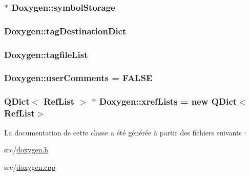 \subsubsection[{symbol\+Storage}]{ $\ast$ Doxygen\+::symbol\+Storage\hspace{0.3cm}{\ttfamily [static]}}\label{class_doxygen_ad63a00fa6d4a5378ab8cd988e0b6df16}
\hypertarget{class_doxygen_a88e47b2392d8845dfb569e4eb56672d4}{}
\subsubsection[{tag\+Destination\+Dict}]{ Doxygen\+::tag\+Destination\+Dict\hspace{0.3cm}{\ttfamily [static]}}\label{class_doxygen_a88e47b2392d8845dfb569e4eb56672d4}
\hypertarget{class_doxygen_ac397d1829788d1ed990f7a240fe28a7c}{}
\subsubsection[{tagfile\+List}]{ Doxygen\+::tagfile\+List\hspace{0.3cm}{\ttfamily [static]}}\label{class_doxygen_ac397d1829788d1ed990f7a240fe28a7c}
\hypertarget{class_doxygen_aa3fdcd31e3aed249e9f27d76dd11d12e}{}
\subsubsection[{user\+Comments}]{ Doxygen\+::user\+Comments = {\bf F\+A\+L\+S\+E}\hspace{0.3cm}{\ttfamily [static]}}\label{class_doxygen_aa3fdcd31e3aed249e9f27d76dd11d12e}
\hypertarget{class_doxygen_a645b82fe7debf260fbedd01c59e3bb87}{}
\subsubsection[{xref\+Lists}]{\setlength{\rightskip}{0pt plus 5cm}Q\+Dict$<$ {\bf Ref\+List} $>$ $\ast$ Doxygen\+::xref\+Lists = new Q\+Dict$<${\bf Ref\+List}$>$\hspace{0.3cm}{\ttfamily [static]}}\label{class_doxygen_a645b82fe7debf260fbedd01c59e3bb87}


La documentation de cette classe a été générée à partir des fichiers suivants \+:\begin{DoxyCompactItemize}
\item 
src/\hyperlink{doxygen_8h}{doxygen.\+h}\item 
src/\hyperlink{doxygen_8cpp}{doxygen.\+cpp}\end{DoxyCompactItemize}
